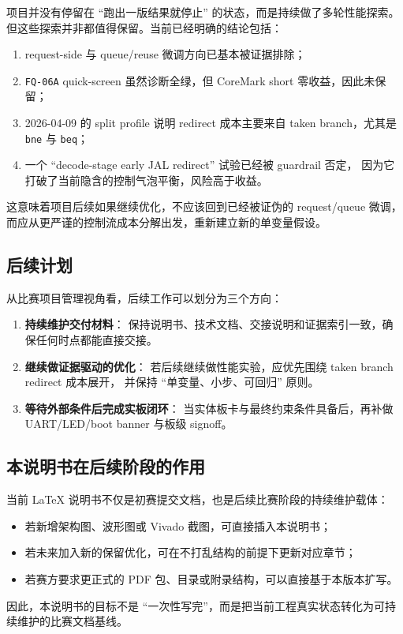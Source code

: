 项目并没有停留在 ``跑出一版结果就停止'' 的状态，而是持续做了多轮性能探索。
但这些探索并非都值得保留。当前已经明确的结论包括：

\begin{enumerate}
    \item request-side 与 queue/reuse 微调方向已基本被证据排除；
    \item \texttt{FQ-06A} quick-screen 虽然诊断全绿，但 CoreMark short 零收益，因此未保留；
    \item 2026-04-09 的 split profile 说明 redirect 成本主要来自 taken branch，尤其是
    \texttt{bne} 与 \texttt{beq}；
    \item 一个 ``decode-stage early JAL redirect'' 试验已经被 guardrail 否定，
    因为它打破了当前隐含的控制气泡平衡，风险高于收益。
\end{enumerate}

这意味着项目后续如果继续优化，不应该回到已经被证伪的 request/queue 微调，
而应从更严谨的控制流成本分解出发，重新建立新的单变量假设。

\subsection{后续计划}

从比赛项目管理视角看，后续工作可以划分为三个方向：

\begin{enumerate}
    \item \textbf{持续维护交付材料}：
    保持说明书、技术文档、交接说明和证据索引一致，确保任何时点都能直接交接。
    \item \textbf{继续做证据驱动的优化}：
    若后续继续做性能实验，应优先围绕 taken branch redirect 成本展开，
    并保持 ``单变量、小步、可回归'' 原则。
    \item \textbf{等待外部条件后完成实板闭环}：
    当实体板卡与最终约束条件具备后，再补做 UART/LED/boot banner 与板级 signoff。
\end{enumerate}

\subsection{本说明书在后续阶段的作用}

当前 LaTeX 说明书不仅是初赛提交文档，也是后续比赛阶段的持续维护载体：

\begin{itemize}
    \item 若新增架构图、波形图或 Vivado 截图，可直接插入本说明书；
    \item 若未来加入新的保留优化，可在不打乱结构的前提下更新对应章节；
    \item 若赛方要求更正式的 PDF 包、目录或附录结构，可以直接基于本版本扩写。
\end{itemize}

因此，本说明书的目标不是 ``一次性写完''，而是把当前工程真实状态转化为可持续维护的比赛文档基线。

\clearpage
